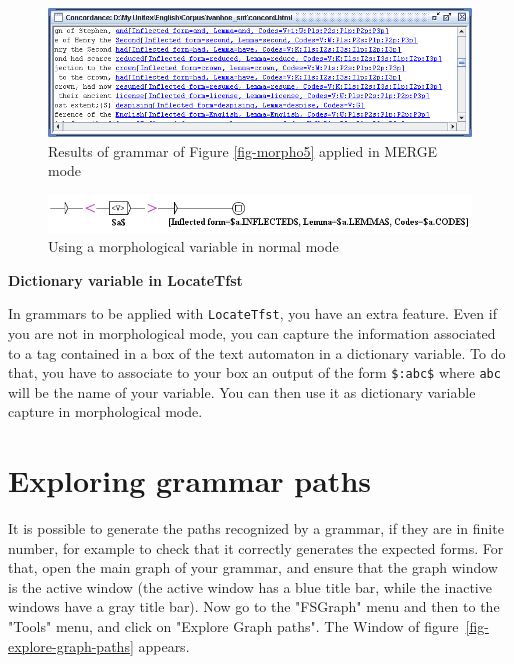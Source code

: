 \begin{figure}[!ht]
\begin{center}
\includegraphics[width=15cm]{resources/img/fig6-17p.png}
\caption{Results of grammar of Figure \ref{fig-morpho5} applied in MERGE mode
\label{fig-morpho6}}
\end{center}
\end{figure}

\begin{figure}[!ht]
\begin{center}
\includegraphics[width=15.5cm]{resources/img/fig6-17q.png}
\caption{Using a morphological variable in normal mode\label{fig-morpho7}}
\end{center}
\end{figure}


\bigskip
\noindent \textbf{Dictionary variable in LocateTfst}

\noindent In grammars to be applied with \verb+LocateTfst+, you have an extra feature. 
Even if you are not in morphological mode, you can capture the information associated to a tag
contained in a box of the text automaton in a dictionary variable. To do that, you have to associate 
to your box an output of the form \verb+$:abc$+ where \verb+abc+ will be the name of your variable.
You can then use it as dictionary variable capture in morphological mode.



\section{Exploring grammar paths}

It is possible to generate the paths recognized by a grammar, if they are in
finite number, for example to check that it correctly generates the expected
forms. For that, open the main graph of your grammar, and ensure that the graph
window is the active window (the active window has a blue title bar, while the
inactive windows have a gray title bar). Now go to the "FSGraph" menu and then to
the "Tools" menu, and click on "Explore Graph paths". The Window of
figure~\ref{fig-explore-graph-paths} appears.



